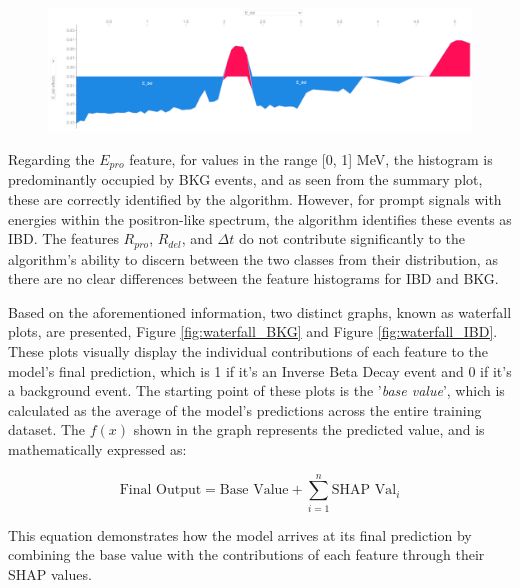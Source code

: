 \begin{figure}[h!]
	\centering
	\includegraphics[width=\linewidth]{Images/Shap/E_del_force_plot.png}
	\label{fig:E_del_force_plot}
\end{figure}

Regarding the $E_{pro}$ feature, for values in the range [0, 1] MeV, the histogram is predominantly occupied by BKG events, and as seen from the summary plot, these are correctly identified by the algorithm. However, for prompt signals with energies within the positron-like spectrum, the algorithm identifies these events as IBD. The features $R_{pro}$, $R_{del}$, and $\Delta t$ do not contribute significantly to the algorithm's ability to discern between the two classes from their distribution, as there are no clear differences between the feature histograms for IBD and BKG.



Based on the aforementioned information, two distinct graphs, known as waterfall plots, are presented, Figure \ref{fig:waterfall_BKG} and Figure \ref{fig:waterfall_IBD}. These plots visually display the individual contributions of each feature to the model's final prediction, which is 1 if it's an Inverse Beta Decay event and 0 if it's a background event. The starting point of these plots is the '\textit{base value}', which is calculated as the average of the model's predictions across the entire training dataset. The $f(x)$ shown in the graph represents the predicted value, and is mathematically expressed as:

\begin{equation}
	\text{Final Output} = \text{Base Value} + \sum_{i=1}^{n} \text{SHAP Val}_{i}
\end{equation}

This equation demonstrates how the model arrives at its final prediction by combining the base value with the contributions of each feature through their SHAP values.

